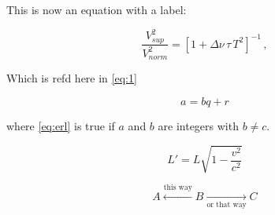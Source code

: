 This is now an equation with a label:

\begin{equation}
\label{eq:1}
\frac{V_{ sup}^2}{V_{ norm}^2} = [1 + \Delta \nu \, \tau \, T^2 ]^{-1} \, ,
\end{equation}

Which is refd here in \ref{eq:1}

\begin{equation} \label{eq:erl}
a = bq + r
\end{equation}

where \eqref{eq:erl} is true if $a$ and $b$ are integers with $b \neq c$.

\begin{equation}
  L' = {L}{\sqrt{1-\frac{v^2}{c^2}}}
 \end{equation}

\[
 A \xleftarrow{\text{this way}} B 
  \xrightarrow[\text{or that way}]{ } C
\]